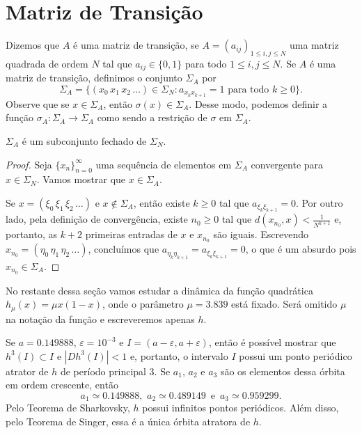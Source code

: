 \section{Matriz de Transição}

Dizemos que $A$ é uma matriz de transição, se $A = (a_{ij})_{1 \leq i,j \leq N}$ uma matriz quadrada de ordem $N$ tal que $a_{ij} \in \lbrace 0, 1 \rbrace$ para todo $1 \leq i,j \leq N$.
Se $A$ é uma matriz de transição, definimos o conjunto $\Sigma_A$ por
$$\Sigma_A = \lbrace (x_0 \, x_1 \, x_2 \, \dots) \in \Sigma_N : a_{x_k x_{k+1}} = 1 \text{ para todo } k \geq 0 \rbrace.$$
Observe que se $x \in \Sigma_A$, então $\sigma(x) \in \Sigma_A$.
Desse modo, podemos definir a função $\sigma_A: \Sigma_A \to \Sigma_A$ como sendo a restrição de $\sigma$ em $\Sigma_A$.

\begin{proposition}
$\Sigma_A$ é um subconjunto fechado de $\Sigma_N$.
\end{proposition}

\begin{proof}
Seja $\lbrace x_n \rbrace_{n=0}^{\infty}$ uma sequência de elementos em $\Sigma_A$ convergente para $x \in \Sigma_N$.
Vamos mostrar que $x \in \Sigma_A$.

Se $x = (\xi_0 \, \xi_1 \, \xi_2 \, \dots)$ e $x \notin \Sigma_A$, então existe $k \geq 0$ tal que $a_{\xi_k \xi_{k+1}} = 0$. Por outro lado, pela definição de convergência, existe $n_0 \geq 0$ tal que $d(x_{n_0}, x) < \frac{1}{N^{k+1}}$ e, portanto, as $k+2$ primeiras entradas de $x$ e $x_{n_0}$ são iguais. Escrevendo $x_{n_0} = (\eta_0 \, \eta_1 \, \eta_2 \, \dots)$, concluímos que $a_{\eta_k \eta_{k+1}} = a_{\xi_k \xi_{k+1}} = 0$, o que é um absurdo pois $x_{n_0} \in \Sigma_A$.
\end{proof}

No restante dessa seção vamos estudar a dinâmica da função quadrática $h_\mu(x) = \mu x(1-x)$, onde o parâmetro $\mu = 3.839$ está fixado. Será omitido $\mu$ na notação da função e escreveremos apenas $h$.

Se $a = 0.149888$, $\varepsilon = 10^{-3}$ e $I = (a - \varepsilon, a + \varepsilon)$, então é possível mostrar que $h^3(I) \subset I$ e $|D h^3(I)| < 1$ e, portanto, o intervalo $I$ possui um ponto periódico atrator de $h$ de período principal $3$. Se $a_1$, $a_2$ e $a_3$ são os elementos dessa órbita em ordem crescente, então
$$a_1 \simeq 0.149888 \text{, } \, a_2 \simeq 0.489149 \, \text{ e } \, a_3 \simeq 0.959299.$$
Pelo Teorema de Sharkovsky, $h$ possui infinitos pontos periódicos. Além disso, pelo Teorema de Singer, essa é a única órbita atratora de $h$.


